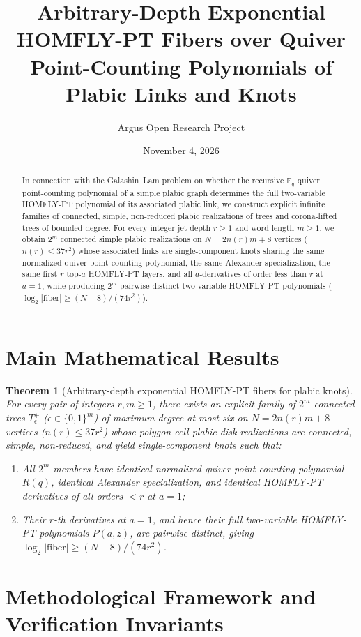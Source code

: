 \documentclass[10pt,reqno]{amsart}
\title[Exponential HOMFLY-PT Fibers of Plabic Links and Knots]
{Arbitrary-Depth Exponential HOMFLY-PT Fibers over Quiver Point-Counting Polynomials of Plabic Links and Knots}
\author{Argus Open Research Project}
\date{November 4, 2026}
\newtheorem{theorem}{Theorem}[section]
\theoremstyle{definition}
\begin{document}
\begin{abstract}
In connection with the Galashin--Lam problem on whether the recursive $\mathbb{F}_q$ quiver point-counting polynomial of a simple plabic graph determines the full two-variable HOMFLY-PT polynomial of its associated plabic link, we construct explicit infinite families of connected, simple, non-reduced plabic realizations of trees and corona-lifted trees of bounded degree. For every integer jet depth $r \ge 1$ and word length $m \ge 1$, we obtain $2^m$ connected simple plabic realizations on $N = 2n(r)m+8$ vertices ($n(r) \le 37r^2$) whose associated links are single-component knots sharing the same normalized quiver point-counting polynomial, the same Alexander specialization, the same first $r$ top-$a$ HOMFLY-PT layers, and all $a$-derivatives of order less than $r$ at $a=1$, while producing $2^m$ pairwise distinct two-variable HOMFLY-PT polynomials ($\log_2|\text{fiber}| \ge (N-8)/(74r^2)$).
\end{abstract}
\maketitle

\section{Main Mathematical Results}
\begin{theorem}[Arbitrary-depth exponential HOMFLY-PT fibers for plabic knots]
For every pair of integers $r,m \ge 1$, there exists an explicit family of $2^m$ connected trees $T^+_\epsilon$ ($\epsilon \in \{0,1\}^m$) of maximum degree at most six on $N = 2n(r)m+8$ vertices ($n(r) \le 37r^2$) whose polygon-cell plabic disk realizations are connected, simple, non-reduced, and yield single-component knots such that:
\begin{enumerate}[label=\textup{(\arabic*)}]
  \item All $2^m$ members have identical normalized quiver point-counting polynomial $R(q)$, identical Alexander specialization, and identical HOMFLY-PT derivatives of all orders $< r$ at $a=1$;
  \item Their $r$-th derivatives at $a=1$, and hence their full two-variable HOMFLY-PT polynomials $P(a,z)$, are pairwise distinct, giving $\log_2|\text{fiber}| \ge (N-8)/(74r^2)$.
\end{enumerate}
\end{theorem}

\section{Methodological Framework and Verification Invariants}
\end{document}
